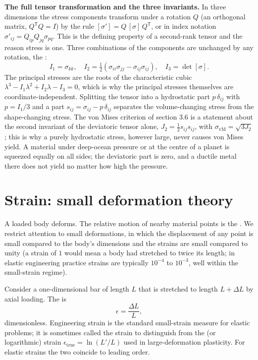 \begin{mastery}
\textbf{The full tensor transformation and the three invariants.} In
three dimensions the stress components transform under a rotation $Q$
(an orthogonal matrix, $Q^{\mathsf{T}}Q = I$) by the rule
$[\sigma'] = Q\,[\sigma]\,Q^{\mathsf{T}}$, or in index notation
$\sigma'_{ij} = Q_{ip}Q_{jq}\sigma_{pq}$. This is the defining property
of a second-rank tensor and the reason stress is one. Three
combinations of the components are unchanged by any rotation, the
:
\[
I_1 = \sigma_{kk}, \quad
I_2 = \tfrac{1}{2}(\sigma_{ii}\sigma_{jj} - \sigma_{ij}\sigma_{ij}),
\quad I_3 = \det[\sigma].
\]
The principal stresses are the roots of the characteristic cubic
$\lambda^3 - I_1\lambda^2 + I_2\lambda - I_3 = 0$, which is why the
principal stresses themselves are coordinate-independent. Splitting the
tensor into a hydrostatic part $p\,\delta_{ij}$ with $p = I_1/3$ and a
 part $s_{ij} = \sigma_{ij} - p\,\delta_{ij}$
separates the volume-changing stress from the shape-changing stress.
The von Mises criterion of section 3.6 is a statement about the second
invariant of the deviatoric tensor alone, $J_2 = \tfrac{1}{2}s_{ij}
s_{ij}$, with $\sigma_{\text{vM}} = \sqrt{3 J_2}$; this is why a purely
hydrostatic stress, however large, never causes von Mises yield. A
material under deep-ocean pressure or at the centre of a planet is
squeezed equally on all sides; the deviatoric part is zero, and a
ductile metal there does not yield no matter how high the pressure.
\end{mastery}

\section{Strain: small deformation theory}

A loaded body deforms. The relative motion of nearby material points
is the . We restrict attention to small deformations,
in which the displacement of any point is small compared to the
body's dimensions and the strains are small compared to unity (a
strain of $1$ would mean a body had stretched to twice its length;
in elastic engineering practice strains are typically $10^{-4}$ to
$10^{-3}$, well within the small-strain regime).

Consider a one-dimensional bar of length $L$ that is stretched to
length $L + \Delta L$ by axial loading. The  is
\[
\epsilon = \frac{\Delta L}{L},
\]
dimensionless. Engineering strain is the standard small-strain
measure for elastic problems; it is sometimes called the
 strain to distinguish from the  (or
logarithmic) strain $\epsilon_{\text{true}} = \ln(L'/L)$ used in
large-deformation plasticity. For elastic strains the two coincide
to leading order.

